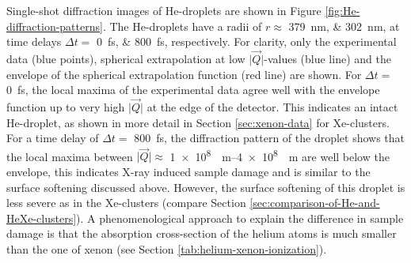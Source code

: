 Single-shot diffraction images of He-droplets are shown in Figure \ref{fig:He-diffraction-patterns}. The He-droplets have a radii of $r\approx$ \SIlist{379;302}{\nano\meter}, at time delays $\Delta t=$ \SIlist{0;800}{\femto\second}, respectively. For clarity, only the experimental data (blue points), spherical extrapolation at low $\lvert\vec{Q}\rvert$-values (blue line) and the envelope of the spherical extrapolation function (red line) are shown. For $\Delta t =$ \SI{0}{\femto\second}, the local maxima of the experimental data agree well with the envelope function up to very high $\lvert\vec{Q}\rvert$ at the edge of the detector. This indicates an intact He-droplet, as shown in more detail in Section \ref{sec:xenon-data} for Xe-clusters. For a time delay of $\Delta t=$ \SI{800}{\femto\second}, the diffraction pattern of the droplet shows that the local maxima between $\lvert\vec{Q}\rvert \approx$ \SIrange[scientific-notation=fixed, fixed-exponent=8]{1e8}{4e8}{\per\meter} are well below the envelope, this indicates X-ray induced sample damage and is similar to the surface softening discussed above. However, the surface softening of this droplet is less severe as in the Xe-clusters (compare Section \ref{sec:comparison-of-He-and-HeXe-clusters}).
A phenomenological approach to explain the difference in sample damage is that the absorption cross-section of the helium atoms is much smaller than the one of xenon (see Section \ref{tab:helium-xenon-ionization}).
%
%
%
%
